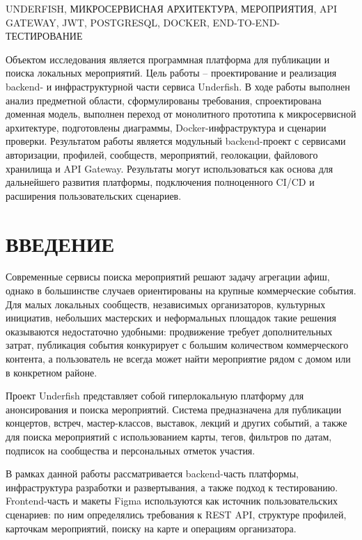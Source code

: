 UNDERFISH, МИКРОСЕРВИСНАЯ АРХИТЕКТУРА, МЕРОПРИЯТИЯ, API GATEWAY, JWT, POSTGRESQL, DOCKER, END-TO-END-ТЕСТИРОВАНИЕ

Объектом исследования является программная платформа для публикации и поиска локальных мероприятий. Цель работы -- проектирование и реализация backend- и инфраструктурной части сервиса Underfish. В ходе работы выполнен анализ предметной области, сформулированы требования, спроектирована доменная модель, выполнен переход от монолитного прототипа к микросервисной архитектуре, подготовлены диаграммы, Docker-инфраструктура и сценарии проверки. Результатом работы является модульный backend-проект с сервисами авторизации, профилей, сообществ, мероприятий, геолокации, файлового хранилища и API Gateway. Результаты могут использоваться как основа для дальнейшего развития платформы, подключения полноценного CI/CD и расширения пользовательских сценариев.

\newpage
\tableofcontents
\newpage

\section*{ВВЕДЕНИЕ}

Современные сервисы поиска мероприятий решают задачу агрегации афиш, однако в большинстве случаев ориентированы на крупные коммерческие события. Для малых локальных сообществ, независимых организаторов, культурных инициатив, небольших мастерских и неформальных площадок такие решения оказываются недостаточно удобными: продвижение требует дополнительных затрат, публикация события конкурирует с большим количеством коммерческого контента, а пользователь не всегда может найти мероприятие рядом с домом или в конкретном районе.

Проект Underfish представляет собой гиперлокальную платформу для анонсирования и поиска мероприятий. Система предназначена для публикации концертов, встреч, мастер-классов, выставок, лекций и других событий, а также для поиска мероприятий с использованием карты, тегов, фильтров по датам, подписок на сообщества и персональных отметок участия.

В рамках данной работы рассматривается backend-часть платформы, инфраструктура разработки и развертывания, а также подход к тестированию. Frontend-часть и макеты Figma используются как источник пользовательских сценариев: по ним определялись требования к REST API, структуре профилей, карточкам мероприятий, поиску на карте и операциям организатора.

